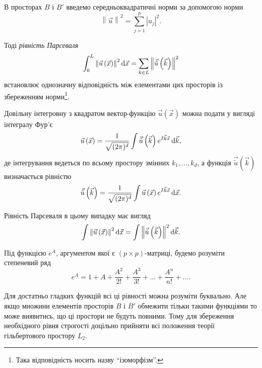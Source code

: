 В просторах $B$ і $B'$ введемо середньоквадратичні норми за допомогою норми
\begin{equation*}
    \left\| \vec u \right\|^2 = \sum_{j = 1}^p |u_j|^2.
\end{equation*}

\begin{proposition}
    Тоді \emph{рівність Парсеваля}
    \begin{equation}
        \label{eq:4.3}
        \int_0^L \left\| \vec u \left( \vec x \right) \right\|^2 \diff \vec x = \sum_{k \in L} \left\| \vec{\tilde{u}} \left( \vec k \right) \right\|^2
    \end{equation}
    встановлює однозначну відповідність між елементами цих просторів із збереженням норми\footnote{Така відповідність носить назву ``ізоморфізм''.}. 
\end{proposition}

Довільну інтегровну з квадратом вектор-функцію $\vec u \left( \vec x \right)$ можна подати у вигляді інтегралу Фур'є
\begin{equation}
    \label{eq:4.4}
    \vec u \left( \vec x \right) = \frac{1}{\sqrt{(2 \pi)^d}} \int \vec{\tilde{u}} \left( \vec k \right) e^{I \vec k \vec x} \diff \vec k,
\end{equation}
де інтегрування ведеться по всьому простору змінних $k_1, \ldots, k_d$, а функція $\vec{\tilde{u}} \left( \vec k \right)$ визначається рівністю
\begin{equation}
    \label{eq:4.5}
    \vec{\tilde{u}} \left( \vec k \right) = \frac{1}{\sqrt{(2 \pi)^d}} \int \vec u \left( \vec x \right) e^{I \vec k \vec x} \diff \vec x.
\end{equation}

Рівність Парсеваля в цьому випадку має вигляд
\begin{equation}
    \label{eq:4.6}
    \int \left\| \vec u \left( \vec x \right) \right\|^2 \diff \vec x = \int \left\| \vec{\tilde{u}} \left( \vec k \right) \right\|^2 \diff \vec k.
\end{equation}

\begin{remark}
    Під функцією $e^A$, аргументом якої є $(p \times p)$-матриці, будемо розуміти степеневий ряд
    \begin{equation*}
        e^A = 1 + A + \frac{A^2}{2!} + \frac{A^3}{3!} + \ldots + \frac{A^n}{n!} + \ldots.
    \end{equation*}
\end{remark}

Для достатньо гладких функцій всі ці рівності можна розуміти буквально. Але якщо множини елементів просторів $B$ і $B'$ обмежити тільки такими функціями то може виявитись, що ці простори не будуть повними. Тому для збереження необхідного рівня строгості доцільно прийняти всі положення теорії гільбертового простору $L_2$. \medskip

